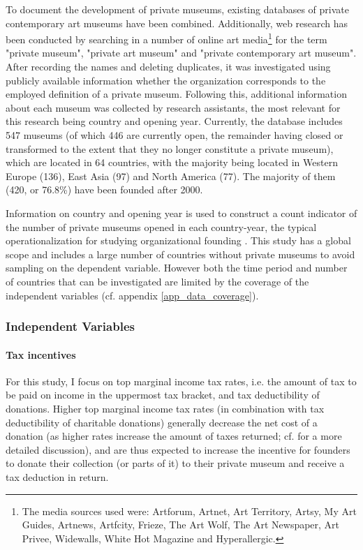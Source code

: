 \documentclass[11pt]{article}
\begin{document}
To document the development of private museums, existing databases of private contemporary art museums \parencite{LarrysList_2015_report,Independent_collectors,global_private_museum_network_2020_museums,BMW_Independent_Collectors_2018_artguide,vdEerenbeemt_vdWauw_DDD_2016} have been combined.
Additionally, web research has been conducted by searching in a number of online art media\footnote{The media sources used were: Artforum, Artnet, Art Territory, Artsy, My Art Guides, Artnews, Artfcity, Frieze, The Art Wolf, The Art Newspaper, Art Privee, Widewalls, White Hot Magazine and Hyperallergic.} for the term "private museum", "private art museum" and "private contemporary art museum".
After recording the names and deleting duplicates, it was investigated using publicly available information whether the organization corresponds to the employed definition of a private museum.
Following this, additional information about each museum was collected by research assistants, the most relevant for this research being country and opening year.
Currently, the database includes 547 museums (of which 446 are currently open, the remainder having closed or transformed to the extent that they no longer constitute a private museum), which are located in 64 countries, with the majority being located in Western Europe (136), East Asia (97) and North America (77).
The majority of them (420, or 76.8\%) have been founded after 2000.


Information on country and opening year is used to construct a count indicator of the number of private museums opened in each country-year, the typical operationalization for studying organizational founding \parencite{Bogaert_etal_2014_ecological}. 
This study has a global scope and includes a large number of countries without private museums to avoid sampling on the dependent variable. 
However both the time period and number of countries that can be investigated are limited by the coverage of the independent variables (cf. appendix \ref{app_data_coverage}). 


\subsubsection*{Independent Variables}

\paragraph*{Tax incentives}

For this study, I focus on top marginal income tax rates, i.e. the amount of tax to be paid on income in the uppermost tax bracket, and tax deductibility of donations.
Higher top marginal income tax rates (in combination with tax deductibility of charitable donations) generally decrease the net cost of a donation (as higher rates increase the amount of taxes returned; cf. \cite{Hemels_2017_incentives} for a more detailed discussion), and are thus expected to increase the incentive for founders to donate their collection (or parts of it) to their private museum and receive a tax deduction in return. 
\end{document}
